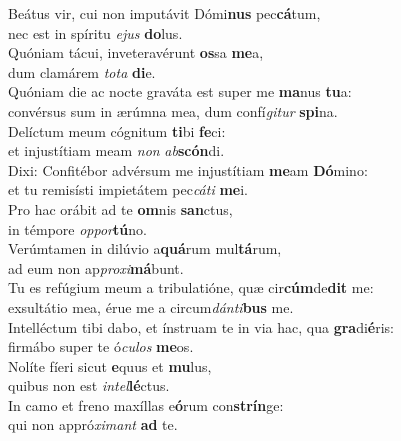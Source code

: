 \evenverse Beátus vir, cui non imputávit Dómi\textbf{nus} pec\textbf{cá}tum,~\*\\
\evenverse nec est in spíritu \textit{e}\textit{jus} \textbf{do}lus.\\
\oddverse Quóniam tácui, inveteravérunt \textbf{os}sa \textbf{me}a,~\*\\
\oddverse dum clamárem \textit{to}\textit{ta} \textbf{di}e.\\
\evenverse Quóniam die ac nocte graváta est super me \textbf{ma}nus \textbf{tu}a:~\*\\
\evenverse convérsus sum in ærúmna mea, dum confí\textit{gi}\textit{tur} \textbf{spi}na.\\
\oddverse Delíctum meum cógnitum \textbf{ti}bi \textbf{fe}ci:~\*\\
\oddverse et injustítiam meam \textit{non} \textit{ab}\textbf{scón}di.\\
\evenverse Dixi: Confitébor advérsum me injustítiam \textbf{me}am \textbf{Dó}mino:~\*\\
\evenverse et tu remisísti impietátem pec\textit{cá}\textit{ti} \textbf{me}i.\\
\oddverse Pro hac orábit ad te \textbf{om}nis \textbf{san}ctus,~\*\\
\oddverse in témpore \textit{op}\textit{por}\textbf{tú}no.\\
\evenverse Verúmtamen in dilúvio a\textbf{quá}rum mul\textbf{tá}rum,~\*\\
\evenverse ad eum non ap\textit{pro}\textit{xi}\textbf{má}bunt.\\
\oddverse Tu es refúgium meum a tribulatióne, quæ cir\textbf{cúm}de\textbf{dit} me:~\*\\
\oddverse exsultátio mea, érue me a circum\textit{dán}\textit{ti}\textbf{bus} me.\\
\evenverse Intelléctum tibi dabo, et ínstruam te in via hac, qua \textbf{gra}di\textbf{é}ris:~\*\\
\evenverse firmábo super te ó\textit{cu}\textit{los} \textbf{me}os.\\
\oddverse Nolíte fíeri sicut \textbf{e}quus et \textbf{mu}lus,~\*\\
\oddverse quibus non est \textit{in}\textit{tel}\textbf{lé}ctus.\\
\evenverse In camo et freno maxíllas e\textbf{ó}rum con\textbf{strín}ge:~\*\\
\evenverse qui non appró\textit{xi}\textit{mant} \textbf{ad} te.\\
